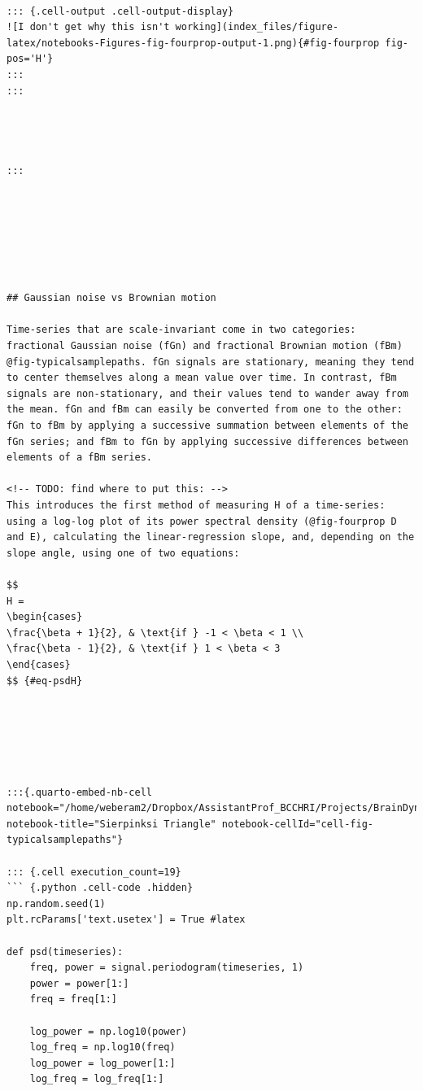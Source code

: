 \documentclass[
  sn-vancouver,
  Numbered,
  referee,
  lineno]{sn-jnl}
\begin{document}
\begin{verbatim}

::: {.cell-output .cell-output-display}
![I don't get why this isn't working](index_files/figure-latex/notebooks-Figures-fig-fourprop-output-1.png){#fig-fourprop fig-pos='H'}
:::
:::




:::







## Gaussian noise vs Brownian motion

Time-series that are scale-invariant come in two categories: fractional Gaussian noise (fGn) and fractional Brownian motion (fBm) @fig-typicalsamplepaths. fGn signals are stationary, meaning they tend to center themselves along a mean value over time. In contrast, fBm signals are non-stationary, and their values tend to wander away from the mean. fGn and fBm can easily be converted from one to the other: fGn to fBm by applying a successive summation between elements of the fGn series; and fBm to fGn by applying successive differences between elements of a fBm series.

<!-- TODO: find where to put this: -->
This introduces the first method of measuring H of a time-series: using a log-log plot of its power spectral density (@fig-fourprop D and E), calculating the linear-regression slope, and, depending on the slope angle, using one of two equations:

$$
H =
\begin{cases}
\frac{\beta + 1}{2}, & \text{if } -1 < \beta < 1 \\
\frac{\beta - 1}{2}, & \text{if } 1 < \beta < 3
\end{cases}
$$ {#eq-psdH}






:::{.quarto-embed-nb-cell notebook="/home/weberam2/Dropbox/AssistantProf_BCCHRI/Projects/BrainDynamics/LiteratureReview/notebooks/Figures.ipynb" notebook-title="Sierpinksi Triangle" notebook-cellId="cell-fig-typicalsamplepaths"}

::: {.cell execution_count=19}
``` {.python .cell-code .hidden}
np.random.seed(1)
plt.rcParams['text.usetex'] = True #latex

def psd(timeseries):
    freq, power = signal.periodogram(timeseries, 1)
    power = power[1:]
    freq = freq[1:]

    log_power = np.log10(power)
    log_freq = np.log10(freq)
    log_power = log_power[1:]
    log_freq = log_freq[1:]


\end{verbatim}
\end{document}
